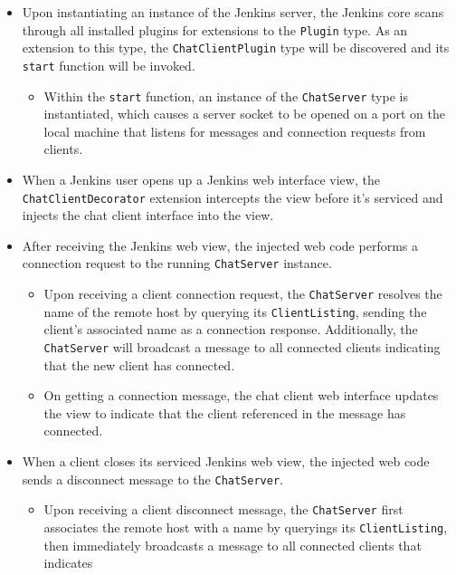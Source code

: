 \documentclass{article}
\newcommand{\classname}[1] {\texttt{#1}}
\newcommand{\methodname}[1] {\texttt{#1}}
\begin{document}
			\begin{itemize}
				\item Upon instantiating an instance of the Jenkins server,
				the Jenkins core scans through all installed plugins for 
				extensions to the \classname{Plugin} type.  As an extension to
				this type, the \classname{ChatClientPlugin} type will be discovered
				and its \methodname{start} function will be invoked.
				\begin{itemize}
					\item Within the \methodname{start} function, an instance of the 
					\classname{ChatServer} type is instantiated, which causes a server
					socket to be opened on a port on the local machine that listens 
					for messages and connection requests from clients.
				\end{itemize}
				\item When a Jenkins user opens up a Jenkins web interface view,
				the \classname{ChatClientDecorator} extension intercepts the view
				before it's serviced and injects the chat client interface into
				the view.
				\item After receiving the Jenkins web view, the injected web code
				performs a connection request to the running \classname{ChatServer}
				instance.
				\begin{itemize}
					\item Upon receiving a client connection request, the 
					\classname{ChatServer} resolves the name of the remote host by
					querying its \classname{ClientListing}, sending the client's 
					associated name as a connection response.  Additionally, the
					\classname{ChatServer} will broadcast a message to all connected 
					clients indicating that the new client has connected.
					\item On getting a connection message, the chat client web
					interface updates the view to indicate that the client
					referenced in the message has connected.
				\end{itemize}
				\item When a client closes its serviced Jenkins web view, the
				injected web code sends a disconnect message to the 
				\classname{ChatServer}.
				\begin{itemize}
					\item Upon receiving a client disconnect message, the 
					\classname{ChatServer} first associates the remote host with a
					name by queryings its \classname{ClientListing}, then immediately
					broadcasts a message to all connected clients that indicates 

\end{itemize}
\end{itemize}
\end{document}
